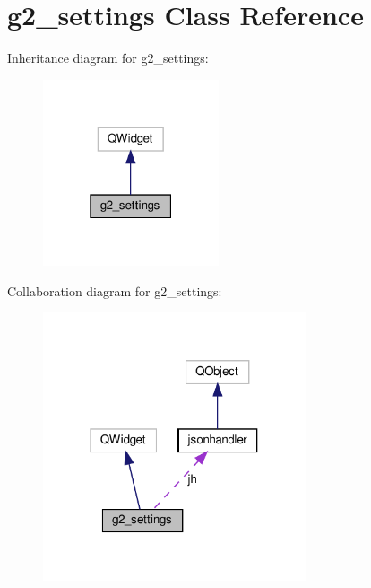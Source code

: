 \hypertarget{classg2__settings}{}\section{g2\+\_\+settings Class Reference}
\label{classg2__settings}


Inheritance diagram for g2\+\_\+settings\+:
\nopagebreak
\begin{figure}[H]
\begin{center}
\leavevmode
\includegraphics[width=147pt]{classg2__settings__inherit__graph}
\end{center}
\end{figure}


Collaboration diagram for g2\+\_\+settings\+:
\nopagebreak
\begin{figure}[H]
\begin{center}
\leavevmode
\includegraphics[width=220pt]{classg2__settings__coll__graph}
\end{center}
\end{figure}
